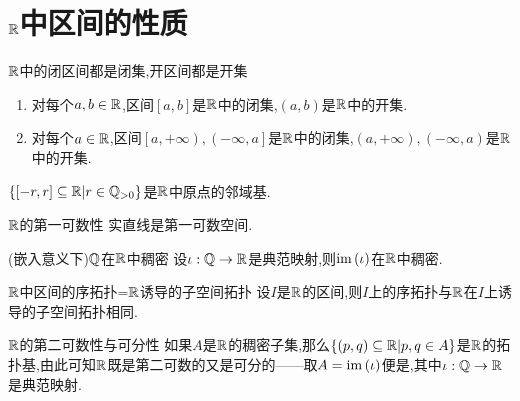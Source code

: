 \section{\texorpdfstring{$\mathbb{R}$}{R}中区间的性质}

\begin{proposition}{$\mathbb{R}$中的闭区间都是闭集,开区间都是开集}{}
	\begin{enumerate}
		\item 对每个$a,b\in\mathbb{R}$,区间$\left[a,b\right]$是$\mathbb{R}$中的闭集,$\left(a,b\right)$是$\mathbb{R}$中的开集.
		\item 对每个$a\in\mathbb{R}$,区间$\left[a,+\infty\right),\left(-\infty,a\right]$是$\mathbb{R}$中的闭集,$\left(a,+\infty\right),\left(-\infty,a\right)$是$\mathbb{R}$中的开集.
	\end{enumerate}
\end{proposition}

\begin{proposition}{}{}
	$\left\{\left[-r,r\right]\subseteq\mathbb{R}\middle|r\in\mathbb{Q}_{>0}\right\}$是$\mathbb{R}$中原点的邻域基.
\end{proposition}

\begin{corollary}{$\mathbb{R}$的第一可数性}{}
	实直线是第一可数空间.
\end{corollary}

\begin{proposition}{(嵌入意义下)$\mathbb{Q}$在$\mathbb{R}$中稠密}{}
	设$\iota:\mathbb{Q}\to\mathbb{R}$是典范映射,则$\operatorname{im}\left(\iota\right)$在$\mathbb{R}$中稠密.
\end{proposition}

\begin{proposition}{$\mathbb{R}$中区间的序拓扑=$\mathbb{R}$诱导的子空间拓扑}{}
	设$I$是$\mathbb{R}$的区间,则$I$上的序拓扑与$\mathbb{R}$在$I$上诱导的子空间拓扑相同.
\end{proposition}

\begin{remark}{$\mathbb{R}$的第二可数性与可分性}{}
	如果$A$是$\mathbb{R}$的稠密子集,那么$\left\{\left(p,q\right)\subseteq\mathbb{R}\middle|p,q\in A\right\}$是$\mathbb{R}$的拓扑基,由此可知$\mathbb{R}$既是第二可数的又是可分的——取$A=\operatorname{im}\left(\iota\right)$便是,其中$\iota:\mathbb{Q}\to\mathbb{R}$是典范映射.
\end{remark}